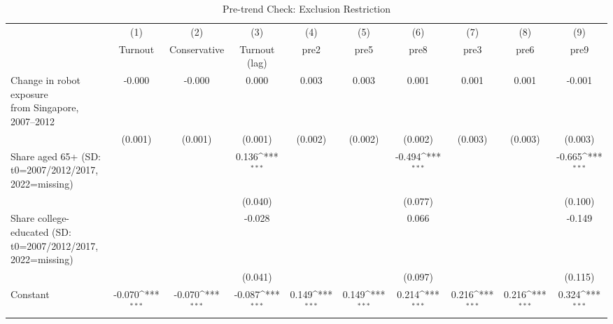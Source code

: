 \begin{table}[htbp]\centering
\def\sym#1{\ifmmode^{#1}\else\(^{#1}\)\fi}
\caption{Pre-trend Check: Exclusion Restriction}
\begin{tabular}{l*{9}{c}}
\toprule
                    &\multicolumn{1}{c}{(1)}&\multicolumn{1}{c}{(2)}&\multicolumn{1}{c}{(3)}&\multicolumn{1}{c}{(4)}&\multicolumn{1}{c}{(5)}&\multicolumn{1}{c}{(6)}&\multicolumn{1}{c}{(7)}&\multicolumn{1}{c}{(8)}&\multicolumn{1}{c}{(9)}\\
                    &\multicolumn{1}{c}{Turnout}&\multicolumn{1}{c}{Conservative}&\multicolumn{1}{c}{Turnout (lag)}&\multicolumn{1}{c}{pre2}&\multicolumn{1}{c}{pre5}&\multicolumn{1}{c}{pre8}&\multicolumn{1}{c}{pre3}&\multicolumn{1}{c}{pre6}&\multicolumn{1}{c}{pre9}\\
\midrule
\shortstack{Change in robot exposure \\ from Singapore, 2007--2012}&      -0.000         &      -0.000         &       0.000         &       0.003         &       0.003         &       0.001         &       0.001         &       0.001         &      -0.001         \\
                    &     (0.001)         &     (0.001)         &     (0.001)         &     (0.002)         &     (0.002)         &     (0.002)         &     (0.003)         &     (0.003)         &     (0.003)         \\
Share aged 65+ (SD: t0=2007/2012/2017, 2022=missing)&                     &                     &       0.136\sym{***}&                     &                     &      -0.494\sym{***}&                     &                     &      -0.665\sym{***}\\
                    &                     &                     &     (0.040)         &                     &                     &     (0.077)         &                     &                     &     (0.100)         \\
Share college-educated (SD: t0=2007/2012/2017, 2022=missing)&                     &                     &      -0.028         &                     &                     &       0.066         &                     &                     &      -0.149         \\
                    &                     &                     &     (0.041)         &                     &                     &     (0.097)         &                     &                     &     (0.115)         \\
Constant            &      -0.070\sym{***}&      -0.070\sym{***}&      -0.087\sym{***}&       0.149\sym{***}&       0.149\sym{***}&       0.214\sym{***}&       0.216\sym{***}&       0.216\sym{***}&       0.324\sym{***}\\

\end{tabular}
\end{table}
